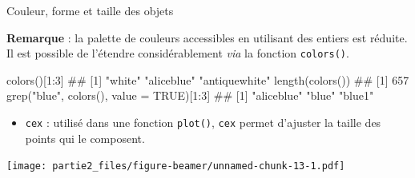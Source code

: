 \documentclass[12pt,ignorenonframetext,]{beamer}
\newenvironment{Shaded}{}{}
\newcommand{\DataTypeTok}[1]{#1}
\newcommand{\DecValTok}[1]{#1}
\newcommand{\KeywordTok}[1]{\textcolor[rgb]{0.00,0.00,1.00}{#1}}
\newcommand{\NormalTok}[1]{#1}
\newcommand{\OperatorTok}[1]{#1}
\newcommand{\OtherTok}[1]{\textcolor[rgb]{1.00,0.25,0.00}{#1}}
\newcommand{\StringTok}[1]{\textcolor[rgb]{0.00,0.50,0.50}{#1}}
\providecommand{\tightlist}{%
  \setlength{\itemsep}{0pt}\setlength{\parskip}{0pt}}
\renewenvironment{Shaded}{\begin{snugshade}}{\end{snugshade}}
\newcommand{\intertitre}[1]{\textcolor{redInsee}{\textbf{#1}}}
\begin{document}
\begin{frame}[fragile]{Couleur, forme et taille des objets}
\protect\hypertarget{couleur-forme-et-taille-des-objets-1}{}

\intertitre{Remarque} : la palette de couleurs accessibles en utilisant
des entiers est réduite. Il est possible de l’étendre considérablement
\emph{via} la fonction \texttt{colors()}.

\small

\begin{Shaded}
\begin{Highlighting}[]
\KeywordTok{colors}\NormalTok{()[}\DecValTok{1}\OperatorTok{:}\DecValTok{3}\NormalTok{]}
\NormalTok{  ## [1] "white"        "aliceblue"    "antiquewhite"}
\KeywordTok{length}\NormalTok{(}\KeywordTok{colors}\NormalTok{())}
\NormalTok{  ## [1] 657}
\KeywordTok{grep}\NormalTok{(}\StringTok{"blue"}\NormalTok{, }\KeywordTok{colors}\NormalTok{(), }\DataTypeTok{value =} \OtherTok{TRUE}\NormalTok{)[}\DecValTok{1}\OperatorTok{:}\DecValTok{3}\NormalTok{]}
\NormalTok{  ## [1] "aliceblue" "blue"      "blue1"}
\end{Highlighting}
\end{Shaded}

\pause \normalsize

\begin{itemize}
\tightlist
\item
  \texttt{cex} : utilisé dans une fonction \texttt{plot()}, \texttt{cex}
  permet d’ajuster la taille des points qui le composent.
\end{itemize}

\texttt{[image: partie2\_files/figure-beamer/unnamed-chunk-13-1.pdf]}

\end{frame}
\end{document}
